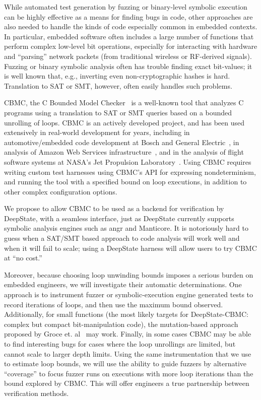 While automated test generation by fuzzing or binary-level symbolic execution can be highly effective as a means for finding bugs in code, other approaches are also needed to handle the kinds of code especially common in embedded contexts.  In particular, embedded software often includes a large number of functions that perform complex low-level bit operations, especially for interacting with hardware and ``parsing'' network packets (from traditional wireless or RF-derived signals).  Fuzzing or binary symbolic analysis often has trouble  finding exact bit-values; it is well known that, e.g., inverting even non-cryptographic hashes is hard.  Translation to SAT or SMT, however, often easily handles such problems.

CBMC, the C Bounded Model Checker~\cite{cbmcp} is a well-known tool that analyzes C programs using a translation to SAT or SMT queries based on a bounded unrolling of loops. CBMC is an actively developed project, and has been used extensively in real-world development for years, including in automotive/embedded code development at Bosch and General Electric~\cite{tiemeyer2019crest}, in analysis of Amazon Web Services infrastructure~\cite{awsmodel}, and in the analysis of flight software systems at NASA's Jet Propulsion Laboratory~\cite{AMAI}.  Using CBMC requires writing custom test harnesses using CBMC's API for expressing nondeterminism, and running the tool with a specified bound on loop executions, in addition to other complex configuration options.

We propose to allow CBMC to be used as a backend for verification by DeepState, with a seamless interface, just as DeepState currently supports symbolic analysis engines such as angr and Manticore.  It is notoriously hard to guess when a SAT/SMT based approach to code analysis will work well and when it will fail to scale; using a DeepState harness will allow users to try CBMC at ``no cost.''

Moreover, because choosing loop unwinding bounds imposes a serious burden on embedded engineers, we will investigate their automatic determinations.  One approach is to instrument fuzzer or symbolic-execution engine generated tests to record iterations of loops, and then use the maximum bound observed.  Additionally, for small functions (the most likely targets for DeepState-CBMC: complex but compact bit-manipulation code), the mutation-based approach proposed by Groce et. al~\cite{groce2018verified} may work.  Finally, in some cases CBMC may be able to find interesting bugs for cases where the loop unrollings are limited, but cannot scale to larger depth limits.  Using the same instrumentation that we use to estimate loop bounds, we will use the ability to guide fuzzers by alternative ``coverage'' to focus fuzzer runs on executions with more loop iterations than the bound explored by CBMC.  This will offer engineers a true partnership between verification methods. 